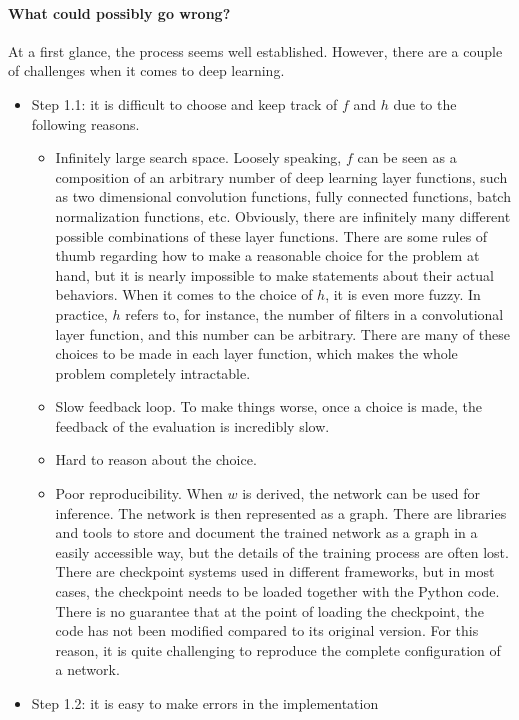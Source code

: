 \paragraph{What could possibly go wrong?}
At a first glance, the process seems well established. However, there are a couple of challenges when it comes to deep learning.
\begin{itemize}
\item Step 1.1: it is difficult to choose and keep track of $f$ and $h$ due to the following reasons.
\begin{itemize}
\item Infinitely large search space. Loosely speaking, $f$ can be seen as a composition of an arbitrary number of deep learning layer functions, such as two dimensional convolution functions, fully connected functions, batch normalization functions, etc. Obviously, there are infinitely many different possible combinations of these layer functions. There are some rules of thumb regarding how to make a reasonable choice for the problem at hand, but it is nearly impossible to make statements about their actual behaviors. When it comes to the choice of $h$, it is even more fuzzy. In practice, $h$ refers to, for instance, the number of filters in a convolutional layer function, and this number can be arbitrary. There are many of these choices to be made in each layer function, which makes the whole problem completely intractable.
\item Slow feedback loop. To make things worse, once a choice is made, the feedback of the evaluation is incredibly slow.
\item Hard to reason about the choice.
\item Poor reproducibility. When $w$ is derived, the network can be used for inference.
  The network is then represented as a graph. There are libraries and tools to store and document the trained network as a graph in a easily accessible way, but the details of the training process are often lost. There are checkpoint systems used in different frameworks, but in most cases, the checkpoint needs to be loaded together with the Python code. There is no guarantee that at the point of loading the checkpoint, the code has not been modified compared to its original version. For this reason, it is quite challenging to reproduce the complete configuration of a network.
\end{itemize}
\item Step 1.2: it is easy to make errors in the implementation
\begin{itemize}

\end{itemize}
\end{itemize}
